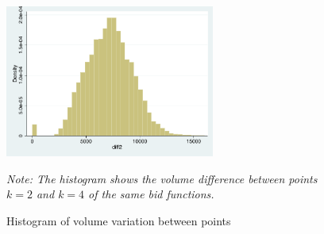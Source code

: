 \begin{subappendices}
\begin{figure}[!ht]
\begin{center}
\includegraphics[height=50mm]{figch2/diff37rangehist.pdf} 
\caption{Histogram of volume variation between points}
\label{diff37rangehist}
\end{center}
\emph{Note: The histogram shows the volume difference between points $k=2$ and $k=4$ of the same bid functions. }
\end{figure}

\end{subappendices}












